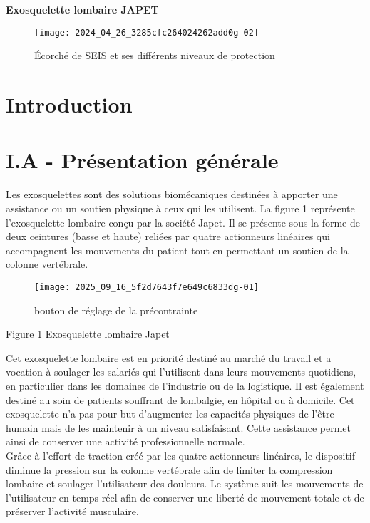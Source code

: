 
\begin{center}
\Large\textbf{\textsf{Exosquelette lombaire JAPET}}
\normalsize
\end{center}


\ifprof
\else
\fi

\ifprof
\begin{corrige}
\end{corrige}
\else
\fi


\begin{figure}[!h]
\centering
\texttt{[image: 2024\_04\_26\_3285cfc264024262add0g-02]}
\caption{\label{ccmp2023_fig_01}Écorché de SEIS et ses différents niveaux de protection}

\end{figure}







\section{Introduction}
\section{I.A - Présentation générale}
Les exosquelettes sont des solutions biomécaniques destinées à apporter une assistance ou un soutien physique à ceux qui les utilisent. La figure 1 représente l'exosquelette lombaire conçu par la société Japet. Il se présente sous la forme de deux ceintures (basse et haute) reliées par quatre actionneurs linéaires qui accompagnent les mouvements du patient tout en permettant un soutien de la colonne vertébrale.

\begin{figure}[h]
\begin{center}
\captionsetup{labelformat=empty}
\caption{bouton de réglage de la précontrainte}
  \texttt{[image: 2025\_09\_16\_5f2d7643f7e649c6833dg-01]}
\end{center}
\end{figure}

Figure 1 Exosquelette lombaire Japet

Cet exosquelette lombaire est en priorité destiné au marché du travail et a vocation à soulager les salariés qui l'utilisent dans leurs mouvements quotidiens, en particulier dans les domaines de l'industrie ou de la logistique. Il est également destiné au soin de patients souffrant de lombalgie, en hôpital ou à domicile. Cet exosquelette n'a pas pour but d'augmenter les capacités physiques de l'être humain mais de les maintenir à un niveau satisfaisant. Cette assistance permet ainsi de conserver une activité professionnelle normale.\\
Grâce à l'effort de traction créé par les quatre actionneurs linéaires, le dispositif diminue la pression sur la colonne vertébrale afin de limiter la compression lombaire et soulager l'utilisateur des douleurs. Le système suit les mouvements de l'utilisateur en temps réel afin de conserver une liberté de mouvement totale et de préserver l'activité musculaire.

